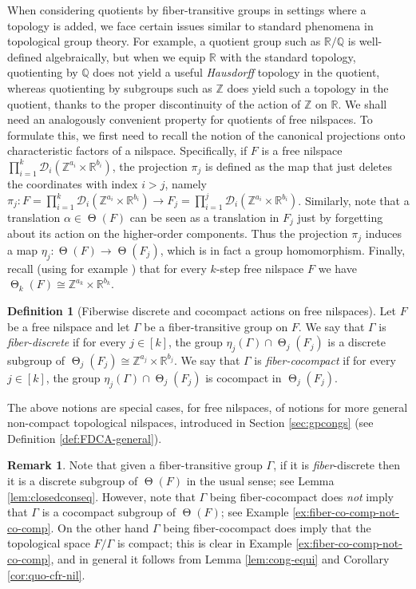 \documentclass[a4paper,12pt,reqno]{amsart}
\theoremstyle{definition}
\newtheorem{defn}[theorem]{Definition}
\newtheorem{remark}[theorem]{Remark}
\def\to{\rightarrow}
\newcommand{\mc}{\mathcal}
\newcommand{\mb}{\mathbb}
\DeclareMathOperator{\tran}{\Theta}
\begin{document}
When considering quotients by fiber-transitive groups in settings where a topology is added, we face certain issues similar to standard phenomena in topological group theory. For example, a quotient group such as $\mb{R}/\mb{Q}$ is well-defined algebraically, but when we equip $\mb{R}$ with the standard topology, quotienting by $\mb{Q}$ does not yield a useful \emph{Hausdorff} topology in the quotient, whereas quotienting by subgroups such as $\mb{Z}$ does yield such a topology in the quotient, thanks to the proper discontinuity of the action of $\mb{Z}$ on $\mb{R}$. We shall need an analogously convenient property for quotients of free nilspaces. To formulate this, we first need to recall the notion of the canonical projections onto characteristic factors of a nilspace. Specifically, if $F$ is a free nilspace $\prod_{i=1}^k \mc{D}_i(\mb{Z}^{a_i}\times \mb{R}^{b_i})$, the projection $\pi_j$ is defined as the map that just deletes the coordinates with index $i > j$, namely $\pi_j:F=\prod_{i=1}^k \mc{D}_i(\mb{Z}^{a_i}\times \mb{R}^{b_i})\to F_j=\prod_{i=1}^j \mc{D}_i(\mb{Z}^{a_i}\times \mb{R}^{b_i})$. Similarly, note that a translation $\alpha\in \tran(F)$ can be seen as a translation in $F_j$ just by forgetting about its action on the higher-order components. Thus the projection $\pi_j$ induces a map $\eta_j:\tran(F)\to \tran(F_j)$, which is in fact a group homomorphism. Finally, recall (using for example  \cite[Lemma 3.2.37]{Cand:Notes1}) that for every $k$-step free nilspace $F$ we have $\tran_k(F)\cong \mb{Z}^{a_k}\times \mb{R}^{b_k}$.
\begin{defn}[Fiberwise discrete and cocompact actions on free nilspaces]\label{def:FDCA}
Let $F$ be a free nilspace and let $\Gamma$ be a fiber-transitive group on $F$. We say that $\Gamma$ is \emph{fiber-discrete} if for every $j\in[k]$, the group $\eta_j(\Gamma)\cap \tran_j(F_j)$ is a discrete subgroup of $\tran_j(F_j)\cong \mb{Z}^{a_j}\times \mb{R}^{b_j}$. We say that $\Gamma$ is \emph{fiber-cocompact} if for every $j\in[k]$, the group $\eta_j(\Gamma)\cap \tran_j(F_j)$ is cocompact in $\tran_j(F_j)$.
\end{defn}
\noindent The above notions are special cases, for free nilspaces, of notions for more general non-compact topological nilspaces, introduced in Section \ref{sec:gpcongs} (see Definition \ref{def:FDCA-general}).
\begin{remark}
Note that given a fiber-transitive group $\Gamma$, if it is \emph{fiber}-discrete then it is a discrete subgroup of $\tran(F)$ in the usual sense; see Lemma \ref{lem:closedconseq}. However, note that $\Gamma$ being fiber-cocompact does \emph{not} imply that $\Gamma$ is a cocompact subgroup of $\tran(F)$; see Example \ref{ex:fiber-co-comp-not-co-comp}. On the other hand $\Gamma$ being fiber-cocompact does imply that the topological space $F/\Gamma$ is compact; this is clear in Example \ref{ex:fiber-co-comp-not-co-comp}, and in general it follows from Lemma \ref{lem:cong-equi} and Corollary \ref{cor:quo-cfr-nil}.
\end{remark}
\end{document}
